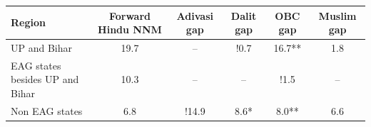 \begin{tabular}{lccccc}
\hline
Region & Forward Hindu NNM & Adivasi gap & Dalit gap & OBC gap & Muslim gap \\
\hline
UP and Bihar&19.7&--&!0.7&16.7**&1.8\\
EAG states besides UP and Bihar&10.3&--&--&!1.5&--\\
Non EAG states&6.8&!14.9&8.6*&8.0**&6.6\\
\hline
\end{tabular}
